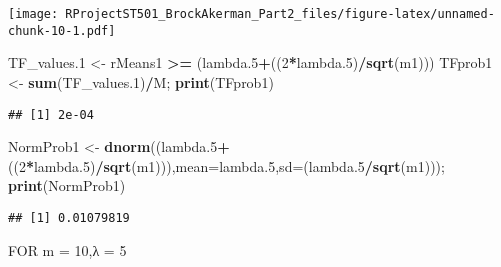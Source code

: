 \documentclass[
]{article}
\newenvironment{Shaded}{\begin{snugshade}}{\end{snugshade}}
\newcommand{\DataTypeTok}[1]{\textcolor[rgb]{0.13,0.29,0.53}{#1}}
\newcommand{\DecValTok}[1]{\textcolor[rgb]{0.00,0.00,0.81}{#1}}
\newcommand{\FloatTok}[1]{\textcolor[rgb]{0.00,0.00,0.81}{#1}}
\newcommand{\KeywordTok}[1]{\textcolor[rgb]{0.13,0.29,0.53}{\textbf{#1}}}
\newcommand{\NormalTok}[1]{#1}
\newcommand{\OperatorTok}[1]{\textcolor[rgb]{0.81,0.36,0.00}{\textbf{#1}}}
\newcommand{\StringTok}[1]{\textcolor[rgb]{0.31,0.60,0.02}{#1}}
\begin{document}
\texttt{[image: RProjectST501\_BrockAkerman\_Part2\_files/figure-latex/unnamed-chunk-10-1.pdf]}

\begin{Shaded}
\begin{Highlighting}[]
\NormalTok{TF_values}\FloatTok{.1}\NormalTok{ <-}\StringTok{ }\NormalTok{rMeans1 }\OperatorTok{>=}\StringTok{ }\NormalTok{(lambda}\FloatTok{.5}\OperatorTok{+}\NormalTok{((}\DecValTok{2}\OperatorTok{*}\NormalTok{lambda}\FloatTok{.5}\NormalTok{)}\OperatorTok{/}\KeywordTok{sqrt}\NormalTok{(m1)))}
\NormalTok{TFprob1 <-}\StringTok{ }\KeywordTok{sum}\NormalTok{(TF_values}\FloatTok{.1}\NormalTok{)}\OperatorTok{/}\NormalTok{M; }\KeywordTok{print}\NormalTok{(TFprob1)}
\end{Highlighting}
\end{Shaded}

\begin{verbatim}
## [1] 2e-04
\end{verbatim}

\begin{Shaded}
\begin{Highlighting}[]
\NormalTok{NormProb1 <-}\StringTok{ }\KeywordTok{dnorm}\NormalTok{((lambda}\FloatTok{.5}\OperatorTok{+}\NormalTok{((}\DecValTok{2}\OperatorTok{*}\NormalTok{lambda}\FloatTok{.5}\NormalTok{)}\OperatorTok{/}\KeywordTok{sqrt}\NormalTok{(m1))),}\DataTypeTok{mean=}\NormalTok{lambda}\FloatTok{.5}\NormalTok{,}\DataTypeTok{sd=}\NormalTok{(lambda}\FloatTok{.5}\OperatorTok{/}\KeywordTok{sqrt}\NormalTok{(m1))); }\KeywordTok{print}\NormalTok{(NormProb1)}
\end{Highlighting}
\end{Shaded}

\begin{verbatim}
## [1] 0.01079819
\end{verbatim}

FOR m = 10,λ = 5
\end{document}
